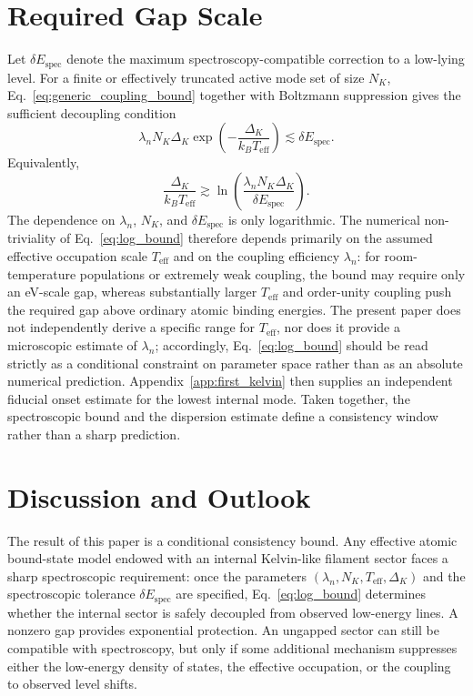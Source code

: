 \documentclass[pdflatex,sn-mathphys-num]{sn-jnl}
\begin{document}
    \section{Required Gap Scale}\label{sec:required_gap}
        Let $\delta E_{\mathrm{spec}}$ denote the maximum spectroscopy-compatible correction to a low-lying level. For a finite or effectively truncated active mode set of size $N_K$, Eq.~\eqref{eq:generic_coupling_bound} together with Boltzmann suppression gives the sufficient decoupling condition
        \begin{equation}
            \lambda_n N_K \Delta_K
            \exp\!\left(-\frac{\Delta_K}{k_B T_{\mathrm{eff}}}\right)
            \lesssim
            \delta E_{\mathrm{spec}}.
            \label{eq:general_bound}
        \end{equation}
        Equivalently,
        \begin{equation}
            \frac{\Delta_K}{k_B T_{\mathrm{eff}}}
            \gtrsim
            \ln\!\left(\frac{\lambda_n N_K \Delta_K}{\delta E_{\mathrm{spec}}}\right).
            \label{eq:log_bound}
        \end{equation}
        The dependence on $\lambda_n$, $N_K$, and $\delta E_{\mathrm{spec}}$ is only logarithmic. The numerical non-triviality of Eq.~\eqref{eq:log_bound} therefore depends primarily on the assumed effective occupation scale $T_{\mathrm{eff}}$ and on the coupling efficiency $\lambda_n$: for room-temperature populations or extremely weak coupling, the bound may require only an eV-scale gap, whereas substantially larger $T_{\mathrm{eff}}$ and order-unity coupling push the required gap above ordinary atomic binding energies. The present paper does not independently derive a specific range for $T_{\mathrm{eff}}$, nor does it provide a microscopic estimate of $\lambda_n$; accordingly, Eq.~\eqref{eq:log_bound} should be read strictly as a conditional constraint on parameter space rather than as an absolute numerical prediction. Appendix~\ref{app:first_kelvin} then supplies an independent fiducial onset estimate for the lowest internal mode. Taken together, the spectroscopic bound and the dispersion estimate define a consistency window rather than a sharp prediction.

    \section{Discussion and Outlook}\label{sec:outlook}
        The result of this paper is a conditional consistency bound. Any effective atomic bound-state model endowed with an internal Kelvin-like filament sector faces a sharp spectroscopic requirement: once the parameters $(\lambda_n,N_K,T_{\mathrm{eff}},\Delta_K)$ and the spectroscopic tolerance $\delta E_{\mathrm{spec}}$ are specified, Eq.~\eqref{eq:log_bound} determines whether the internal sector is safely decoupled from observed low-energy lines. A nonzero gap provides exponential protection. An ungapped sector can still be compatible with spectroscopy, but only if some additional mechanism suppresses either the low-energy density of states, the effective occupation, or the coupling to observed level shifts.
\end{document}
